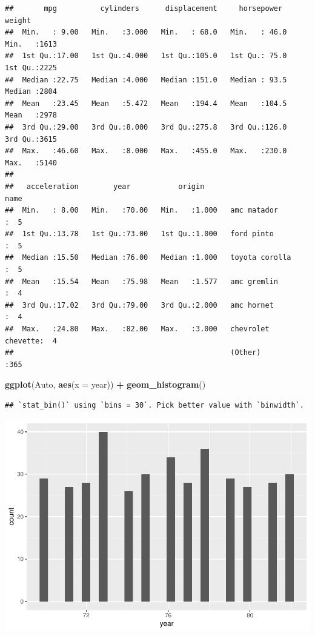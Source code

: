 \documentclass[
]{article}
\newenvironment{Shaded}{\begin{snugshade}}{\end{snugshade}}
\newcommand{\AttributeTok}[1]{\textcolor[rgb]{0.13,0.29,0.53}{#1}}
\newcommand{\FunctionTok}[1]{\textcolor[rgb]{0.13,0.29,0.53}{\textbf{#1}}}
\newcommand{\NormalTok}[1]{#1}
\newcommand{\SpecialCharTok}[1]{\textcolor[rgb]{0.81,0.36,0.00}{\textbf{#1}}}
\begin{document}
\begin{verbatim}
##       mpg          cylinders      displacement     horsepower        weight    
##  Min.   : 9.00   Min.   :3.000   Min.   : 68.0   Min.   : 46.0   Min.   :1613  
##  1st Qu.:17.00   1st Qu.:4.000   1st Qu.:105.0   1st Qu.: 75.0   1st Qu.:2225  
##  Median :22.75   Median :4.000   Median :151.0   Median : 93.5   Median :2804  
##  Mean   :23.45   Mean   :5.472   Mean   :194.4   Mean   :104.5   Mean   :2978  
##  3rd Qu.:29.00   3rd Qu.:8.000   3rd Qu.:275.8   3rd Qu.:126.0   3rd Qu.:3615  
##  Max.   :46.60   Max.   :8.000   Max.   :455.0   Max.   :230.0   Max.   :5140  
##                                                                                
##   acceleration        year           origin                      name    
##  Min.   : 8.00   Min.   :70.00   Min.   :1.000   amc matador       :  5  
##  1st Qu.:13.78   1st Qu.:73.00   1st Qu.:1.000   ford pinto        :  5  
##  Median :15.50   Median :76.00   Median :1.000   toyota corolla    :  5  
##  Mean   :15.54   Mean   :75.98   Mean   :1.577   amc gremlin       :  4  
##  3rd Qu.:17.02   3rd Qu.:79.00   3rd Qu.:2.000   amc hornet        :  4  
##  Max.   :24.80   Max.   :82.00   Max.   :3.000   chevrolet chevette:  4  
##                                                  (Other)           :365
\end{verbatim}

\begin{Shaded}
\begin{Highlighting}[]
\FunctionTok{ggplot}\NormalTok{(Auto, }\FunctionTok{aes}\NormalTok{(}\AttributeTok{x =}\NormalTok{ year)) }\SpecialCharTok{+} \FunctionTok{geom\_histogram}\NormalTok{()}
\end{Highlighting}
\end{Shaded}

\begin{verbatim}
## `stat_bin()` using `bins = 30`. Pick better value with `binwidth`.
\end{verbatim}

\includegraphics{Modelos_Estatisticos-2024-08-10_files/figure-latex/unnamed-chunk-3-1.pdf}
\end{document}
